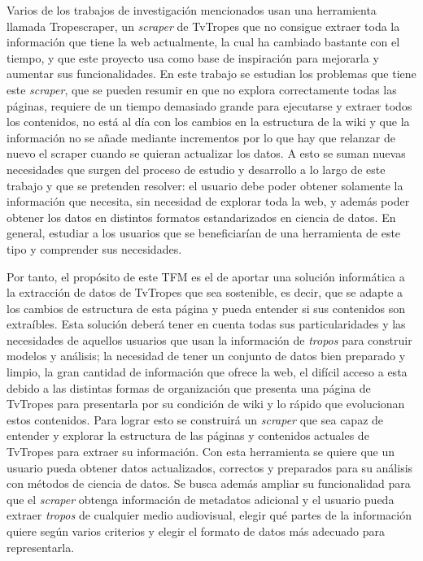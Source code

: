 Varios de los trabajos de investigación mencionados usan una herramienta llamada
Tropescraper, un \textit{scraper} de TvTropes que no consigue extraer toda la
información que tiene la web actualmente, la cual ha cambiado bastante con el
tiempo, y que este proyecto usa como base de inspiración para mejorarla y
aumentar sus funcionalidades. En este trabajo se estudian los problemas que
tiene este \textit{scraper}, que se pueden resumir en que no explora
correctamente todas las páginas, requiere de un tiempo demasiado grande para
ejecutarse y extraer todos los contenidos, no está al día con los cambios en la
estructura de la wiki y que la información no se añade mediante incrementos por
lo que hay que relanzar de nuevo el scraper cuando se quieran actualizar los
datos. A esto se suman nuevas necesidades que surgen del proceso de estudio y
desarrollo a lo largo de este trabajo y que se pretenden resolver: el usuario
debe poder obtener solamente la información que necesita, sin necesidad de
explorar toda la web, y además poder obtener los datos en distintos formatos
estandarizados en ciencia de datos. En general, estudiar a los usuarios que se
beneficiarían de una herramienta de este tipo y comprender sus necesidades.

Por tanto, el propósito de este TFM es el de aportar una solución informática a
la extracción de datos de TvTropes que sea sostenible, es decir, que se adapte a
los cambios de estructura de esta página y pueda entender si sus contenidos son
extraíbles. Esta solución deberá tener en cuenta todas sus particularidades y
las necesidades de aquellos usuarios que usan la información de \textit{tropos}
para construir modelos y análisis; la necesidad de tener un conjunto de datos
bien preparado y limpio, la gran cantidad de información que ofrece la web, el
difícil acceso a esta debido a las distintas formas de organización que presenta
una página de TvTropes para presentarla por su condición de wiki y lo rápido que
evolucionan estos contenidos. Para lograr esto se construirá un \textit{scraper}
que sea capaz de entender y explorar la estructura de las páginas y contenidos
actuales de TvTropes para extraer su información. Con esta herramienta se quiere
que un usuario pueda obtener datos actualizados, correctos y preparados para su
análisis con métodos de ciencia de datos. Se busca además ampliar su
funcionalidad para que el \textit{scraper} obtenga información de metadatos
adicional y el usuario pueda extraer \textit{tropos} de cualquier medio
audiovisual, elegir qué partes de la información quiere según varios criterios y
elegir el formato de datos más adecuado para representarla.


